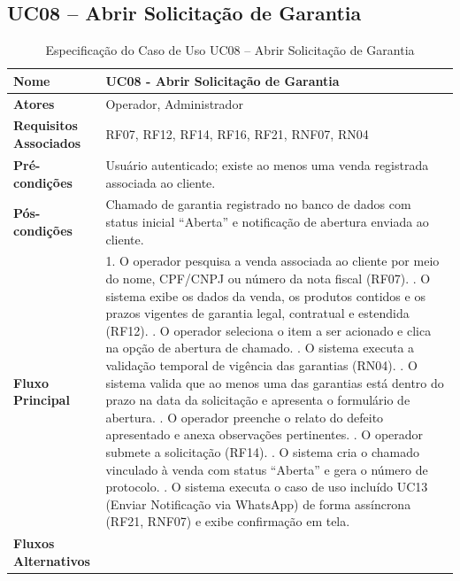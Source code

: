 \subsection{UC08 – Abrir Solicitação de Garantia}

\begin{table}[H]
	\footnotesize
	\centering
	\caption{Especificação do Caso de Uso UC08 – Abrir Solicitação de Garantia}
	\label{tab:uc08}
	\begin{tabular}{|p{3.5cm}|p{11.5cm}|}
		\hline
		\textbf{Nome} & UC08 - Abrir Solicitação de Garantia \\ \hline
		\textbf{Atores} & Operador, Administrador \\ \hline
		\textbf{Requisitos Associados} & RF07, RF12, RF14, RF16, RF21, RNF07, RN04 \\ \hline
	\textbf{Pré-condições} & Usuário autenticado; existe ao menos uma venda registrada associada ao cliente. \\ \hline
	\textbf{Pós-condições} & Chamado de garantia registrado no banco de dados com status inicial ``Aberta'' e notificação de abertura enviada ao cliente. \\ \hline
	\textbf{Fluxo Principal} & 
	1. O operador pesquisa a venda associada ao cliente por meio do nome, CPF/CNPJ ou número da nota fiscal (RF07). \newline
	2. O sistema exibe os dados da venda, os produtos contidos e os prazos vigentes de garantia legal, contratual e estendida (RF12). \newline
	3. O operador seleciona o item a ser acionado e clica na opção de abertura de chamado. \newline
	4. O sistema executa a validação temporal de vigência das garantias (RN04). \newline
	5. O sistema valida que ao menos uma das garantias está dentro do prazo na data da solicitação e apresenta o formulário de abertura. \newline
	6. O operador preenche o relato do defeito apresentado e anexa observações pertinentes. \newline
	7. O operador submete a solicitação (RF14). \newline
	8. O sistema cria o chamado vinculado à venda com status ``Aberta'' e gera o número de protocolo. \newline
	9. O sistema executa o caso de uso incluído UC13 (Enviar Notificação via WhatsApp) de forma assíncrona (RF21, RNF07) e exibe confirmação em tela. \\ \hline
	\textbf{Fluxos Alternativos} & 

\end{tabular}
\end{table}
